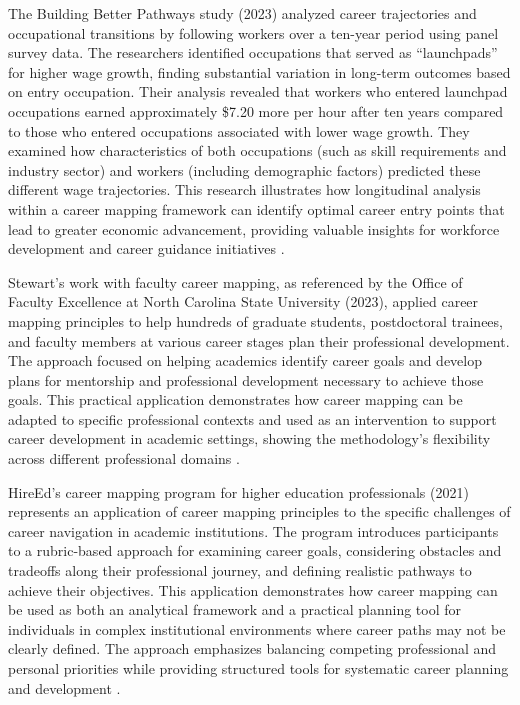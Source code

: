 \documentclass[../main.tex]{subfiles}
\begin{document}
The Building Better Pathways study (2023) analyzed career trajectories and occupational transitions by following workers over a ten-year period using panel survey data. The researchers identified occupations that served as ``launchpads'' for higher wage growth, finding substantial variation in long-term outcomes based on entry occupation. Their analysis revealed that workers who entered launchpad occupations earned approximately \$7.20 more per hour after ten years compared to those who entered occupations associated with lower wage growth. They examined how characteristics of both occupations (such as skill requirements and industry sector) and workers (including demographic factors) predicted these different wage trajectories. This research illustrates how longitudinal analysis within a career mapping framework can identify optimal career entry points that lead to greater economic advancement, providing valuable insights for workforce development and career guidance initiatives \citep{workforcegps2023}.

Stewart's work with faculty career mapping, as referenced by the Office of Faculty Excellence at North Carolina State University (2023), applied career mapping principles to help hundreds of graduate students, postdoctoral trainees, and faculty members at various career stages plan their professional development. The approach focused on helping academics identify career goals and develop plans for mentorship and professional development necessary to achieve those goals. This practical application demonstrates how career mapping can be adapted to specific professional contexts and used as an intervention to support career development in academic settings, showing the methodology's flexibility across different professional domains \citep{ncsu2023}.

HireEd's career mapping program for higher education professionals (2021) represents an application of career mapping principles to the specific challenges of career navigation in academic institutions. The program introduces participants to a rubric-based approach for examining career goals, considering obstacles and tradeoffs along their professional journey, and defining realistic pathways to achieve their objectives. This application demonstrates how career mapping can be used as both an analytical framework and a practical planning tool for individuals in complex institutional environments where career paths may not be clearly defined. The approach emphasizes balancing competing professional and personal priorities while providing structured tools for systematic career planning and development \citep{hireed2021}.
\end{document}
